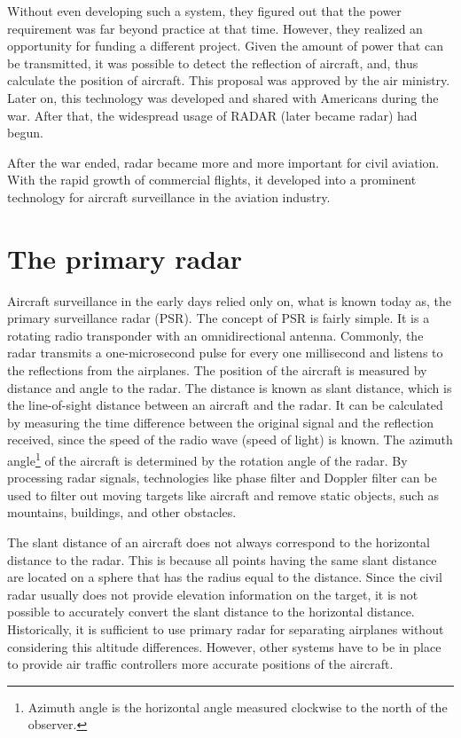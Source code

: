 Without even developing such a system, they figured out that the power requirement was far beyond practice at that time. However, they realized an opportunity for funding a different project. Given the amount of power that can be transmitted, it was possible to detect the reflection of aircraft, and, thus calculate the position of aircraft. This proposal was approved by the air ministry. Later on, this technology was developed and shared with Americans during the war. After that, the widespread usage of RADAR (later became radar) had begun.

After the war ended, radar became more and more important for civil aviation. With the rapid growth of commercial flights, it developed into a prominent technology for aircraft surveillance in the aviation industry.

\section{The primary radar}

Aircraft surveillance in the early days relied only on, what is known today as, the primary surveillance radar (PSR). The concept of PSR is fairly simple. It is a rotating radio transponder with an omnidirectional antenna. Commonly, the radar transmits a one-microsecond pulse for every one millisecond and listens to the reflections from the airplanes. The position of the aircraft is measured by distance and angle to the radar. The distance is known as slant distance, which is the line-of-sight distance between an aircraft and the radar. It can be calculated by measuring the time difference between the original signal and the reflection received, since the speed of the radio wave (speed of light) is known. The azimuth angle\footnote{Azimuth angle is the horizontal angle measured clockwise to the north of the observer.} of the aircraft is determined by the rotation angle of the radar. By processing radar signals, technologies like phase filter and Doppler filter can be used to filter out moving targets like aircraft and remove static objects, such as mountains, buildings, and other obstacles.

The slant distance of an aircraft does not always correspond to the horizontal distance to the radar. This is because all points having the same slant distance are located on a sphere that has the radius equal to the distance. Since the civil radar usually does not provide elevation information on the target, it is not possible to accurately convert the slant distance to the horizontal distance. Historically, it is sufficient to use primary radar for separating airplanes without considering this altitude differences. However, other systems have to be in place to provide air traffic controllers more accurate positions of the aircraft.

